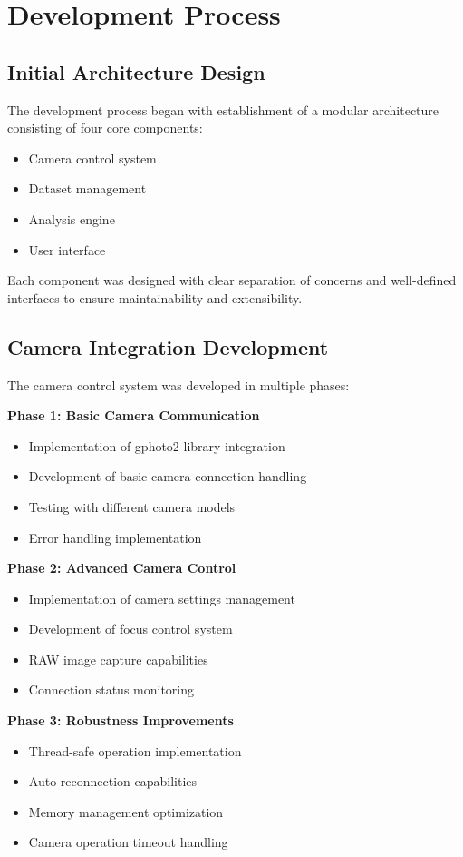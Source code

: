 \section{Development Process}

\subsection{Initial Architecture Design}
The development process began with establishment of a modular architecture consisting of four core components:

\begin{itemize}
    \item Camera control system
    \item Dataset management
    \item Analysis engine
    \item User interface
\end{itemize}

Each component was designed with clear separation of concerns and well-defined interfaces to ensure maintainability and extensibility.

\subsection{Camera Integration Development}
The camera control system was developed in multiple phases:

\textbf{Phase 1: Basic Camera Communication}
\begin{itemize}
    \item Implementation of gphoto2 library integration
    \item Development of basic camera connection handling
    \item Testing with different camera models
    \item Error handling implementation
\end{itemize}

\textbf{Phase 2: Advanced Camera Control}
\begin{itemize}
    \item Implementation of camera settings management
    \item Development of focus control system
    \item RAW image capture capabilities
    \item Connection status monitoring
\end{itemize}

\textbf{Phase 3: Robustness Improvements}
\begin{itemize}
    \item Thread-safe operation implementation
    \item Auto-reconnection capabilities
    \item Memory management optimization
    \item Camera operation timeout handling
\end{itemize}

